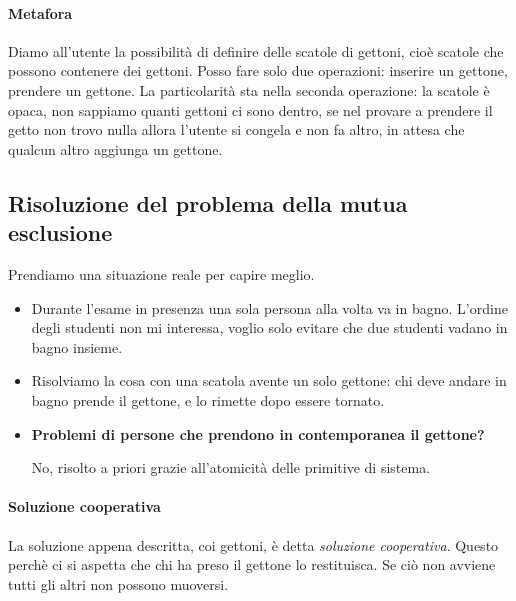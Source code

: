\documentclass[11pt]{report}
\theoremstyle{definition}
\begin{document}
\paragraph{Metafora}  Diamo all'utente la possibilità di definire delle scatole di gettoni, cioè scatole che possono contenere dei gettoni. Posso fare solo due operazioni: inserire un gettone, prendere un gettone. La particolarità sta nella seconda operazione: la scatole è opaca, non sappiamo quanti gettoni ci sono dentro, se nel provare a prendere il getto non trovo nulla allora l'utente si congela e non fa altro, in attesa che qualcun altro aggiunga un gettone.



\subsection{Risoluzione del problema della mutua esclusione}
Prendiamo una situazione reale per capire meglio.
\begin{itemize}
	\item Durante l'esame in presenza una sola persona alla volta va in bagno. L'ordine degli studenti non mi interessa, voglio solo evitare che due studenti vadano in bagno insieme. 
	\item Risolviamo la cosa con una scatola avente un solo gettone: chi deve andare in bagno prende il gettone, e lo rimette dopo essere tornato. 
	
	\item \textbf{Problemi di persone che prendono in contemporanea il gettone?} 
	
	No, risolto a priori grazie all'atomicità delle primitive di sistema. 
\end{itemize}
\paragraph{Soluzione cooperativa} La soluzione appena descritta, coi gettoni, è detta \emph{soluzione cooperativa}. Questo perchè ci si aspetta che chi ha preso il gettone lo restituisca. Se ciò non avviene tutti gli altri non possono muoversi.
\end{document}
